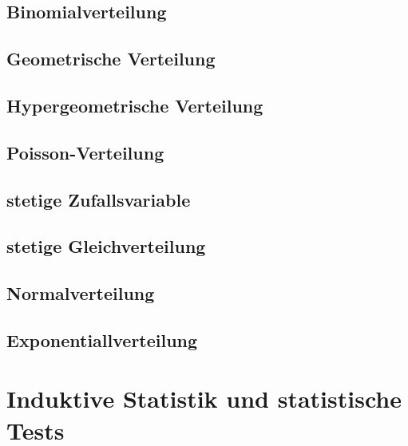 \documentclass[a4paper]{scrartcl}
\begin{document}
        \subsection{Binomialverteilung}
        \subsection{Geometrische Verteilung}
        \subsection{Hypergeometrische Verteilung}
        \subsection{Poisson-Verteilung}
        \subsection{stetige Zufallsvariable}
        \subsection{stetige Gleichverteilung}
        \subsection{Normalverteilung}
        \subsection{Exponentiallverteilung}
    \section{Induktive Statistik und statistische Tests}
\end{document}
